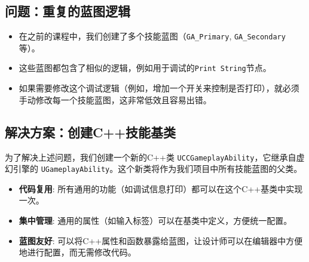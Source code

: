 \documentclass[10pt,CJKmath]{zhbook-v1}
\begin{document}
\subsection{问题：重复的蓝图逻辑}
\begin{itemize}
    \item 在之前的课程中，我们创建了多个技能蓝图（\texttt{GA\_Primary}, \texttt{GA\_Secondary}等）。
    \item 这些蓝图都包含了相似的逻辑，例如用于调试的\texttt{Print String}节点。
    \item 如果需要修改这个调试逻辑（例如，增加一个开关来控制是否打印），就必须手动修改每一个技能蓝图，这非常低效且容易出错。
\end{itemize}

\subsection{解决方案：创建C++技能基类}
为了解决上述问题，我们创建一个新的C++类 \texttt{UCCGameplayAbility}，它继承自虚幻引擎的 \texttt{UGameplayAbility}。这个新类将作为我们项目中所有技能蓝图的父类。
\begin{itemize}
    \item \textbf{代码复用}: 所有通用的功能（如调试信息打印）都可以在这个C++基类中实现一次。
    \item \textbf{集中管理}: 通用的属性（如输入标签）可以在基类中定义，方便统一配置。
    \item \textbf{蓝图友好}: 可以将C++属性和函数暴露给蓝图，让设计师可以在编辑器中方便地进行配置，而无需修改代码。
\end{itemize}
\end{document}
